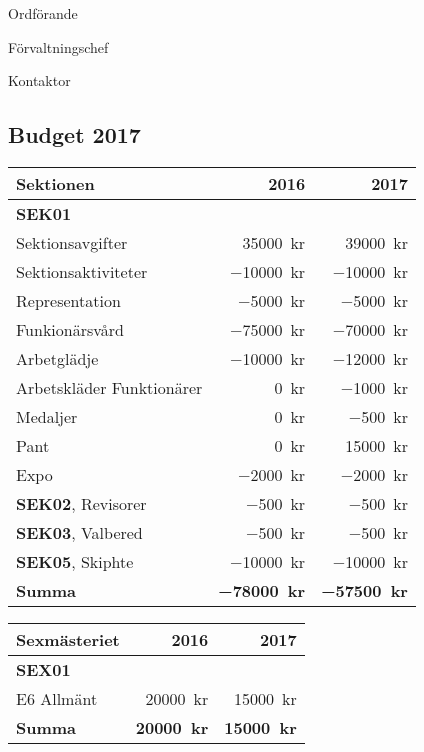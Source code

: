 \documentclass[../_main/handlingar.tex]{subfiles}
\begin{document}
\begin{signatures}{3}
    \ist
    \signature{\ordf}{Ordförande}
    \signature{Anders Nilsson}{Förvaltningschef}
    \signature{Erik Månsson}{Kontaktor}
\end{signatures}

\newpage
\subsection*{Budget 2017}
\begin{tabularx}{10cm}{X r r}
    \textbf{\large Sektionen} & \textbf{2016} & \textbf{2017} \\
    \hline
    \textbf{SEK01} \\
    Sektionsavgifter & \SI{35000}{kr} & \SI{39000}{kr} \\
    Sektionsaktiviteter & \SI{-10000}{kr} & \SI{-10000}{kr} \\
    Representation & \SI{-5000}{kr} & \SI{-5000}{kr} \\
    Funkionärsvård & \SI{-75000}{kr} & \SI{-70000}{kr} \\
    Arbetglädje & \SI{-10000}{kr} & \SI{-12000}{kr} \\
    Arbetskläder Funktionärer & \SI{0}{kr} & \SI{-1000}{kr} \\
    Medaljer & \SI{0}{kr} & \SI{-500}{kr} \\
    Pant & \SI{0}{kr} & \SI{15000}{kr} \\
    Expo & \SI{-2000}{kr} & \SI{-2000}{kr} \\
    \textbf{SEK02}, Revisorer & \SI{-500}{kr} & \SI{-500}{kr} \\
    \textbf{SEK03}, Valbered & \SI{-500}{kr} & \SI{-500}{kr} \\
    \textbf{SEK05}, Skiphte & \SI{-10000}{kr} & \SI{-10000}{kr} \\
    \hline
    \textbf{Summa} & \textbf{\SI{-78000}{kr}} & \textbf{\SI{-57500}{kr}} \\
\end{tabularx}

\begin{tabularx}{10cm}{X r r}
    \textbf{\large Sexmästeriet} & \textbf{2016} & \textbf{2017} \\
    \hline
    \textbf{SEX01} \\
    E6 Allmänt & \SI{20000}{kr} & \SI{15000}{kr} \\
    \hline
    \textbf{Summa} & \textbf{\SI{20000}{kr}} & \textbf{\SI{15000}{kr}} \\
\end{tabularx}
\end{document}
